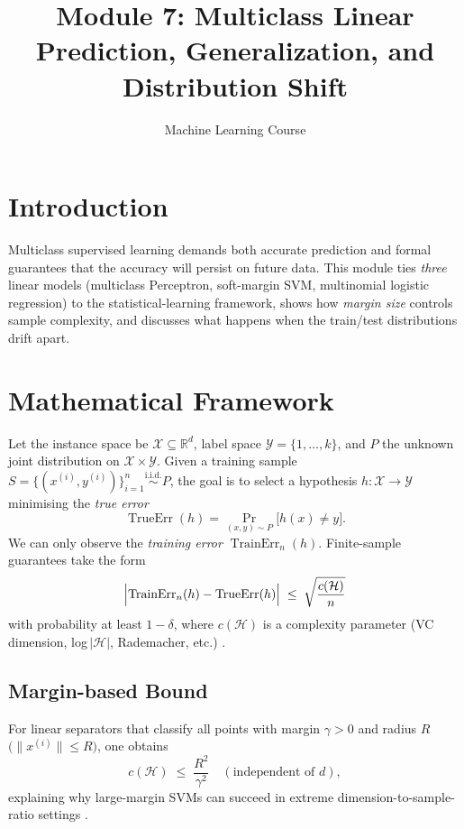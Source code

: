 \documentclass{article}
\title{Module 7: Multiclass Linear Prediction, Generalization, and Distribution Shift}
\author{Machine Learning Course}
\date{}
\begin{document}
\maketitle
\tableofcontents
\newpage

\section{Introduction}
Multiclass supervised learning demands both accurate prediction
and formal guarantees that the accuracy will persist on future data.
This module ties \emph{three} linear models
(multiclass Perceptron, soft-margin SVM, multinomial logistic regression)
to the statistical-learning framework, shows how \emph{margin size}
controls sample complexity, and discusses what happens
when the train/test distributions drift apart.

\section{Mathematical Framework}\label{sec:SLT}
Let the instance space be $\mathcal{X}\subseteq\mathbb{R}^{d}$,
label space $\mathcal{Y}=\{1,\dots,k\}$,
and $P$ the unknown joint distribution on $\mathcal{X}\!\times\!\mathcal{Y}$.
Given a training sample
$S=\{(x^{(i)},y^{(i)})\}_{i=1}^{n}\stackrel{\text{i.i.d.}}{\sim}P$,
the goal is to select a hypothesis $h:\mathcal{X}\!\to\!\mathcal{Y}$
minimising the \textit{true error}
\[
\operatorname{TrueErr}(h)=
\Pr_{(x,y)\sim P}\!\bigl[h(x)\neq y\bigr].
\]
We can only observe the \textit{training error}
$\operatorname{TrainErr}_{n}(h)$.
Finite-sample guarantees take the form
\[
\Bigl|\operatorname{TrainErr}_{n}(h)-\operatorname{TrueErr}(h)\Bigr|
\;\le\;
\sqrt{\frac{c(\mathcal{H})}{n}}
\]
with probability at least $1-\delta$,
where $c(\mathcal{H})$ is a complexity parameter
(VC dimension, log\,$|\mathcal{H}|$, Rademacher, etc.)
\cite{vapnik1998}.\\%

\subsection{Margin-based Bound}
For linear separators that classify all points with margin
$\gamma>0$ and radius $R$
$\bigl(\|x^{(i)}\|\le R\bigr)$,
one obtains
\[
c(\mathcal{H})\;\le\;\frac{R^{2}}{\gamma^{2}}
\quad(\text{independent of }d),
\]
explaining why large-margin SVMs can succeed in
extreme dimension-to-sample-ratio settings
\cite{bartlett1998}.\\%
\end{document}
